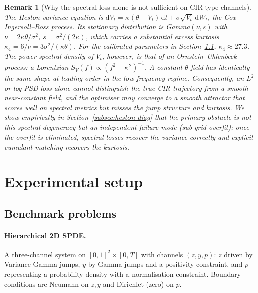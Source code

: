 \documentclass[review,12pt]{elsarticle}
\newtheorem{remark}{Remark}
\begin{document}
\begin{remark}[Why the spectral loss alone is not sufficient on CIR-type channels]
\label{rem:cir}
The Heston variance equation is
\(\mathrm dV_t = \kappa(\theta - V_t)\,\mathrm dt
+ \sigma \sqrt{V_t}\,\mathrm dW_t\), the Cox--Ingersoll--Ross
process. Its stationary distribution is Gamma\((\nu, s)\) with
\(\nu = 2\kappa\theta/\sigma^2\), \(s = \sigma^2/(2\kappa)\),
which carries a substantial excess kurtosis
\(\kappa_4 = 6/\nu = 3\sigma^2/(\kappa\theta)\). For the
calibrated parameters in Section~\ref{subsec:problems},
\(\kappa_4 \approx 27.3\). The power spectral density of
\(V_t\), however, is that of an Ornstein--Uhlenbeck process:
a Lorentzian \(S_V(f) \propto (f^2 + \kappa^2)^{-1}\). A
constant-\(\theta\) field has \emph{identically the same shape}
at leading order in the low-frequency regime. Consequently,
an \(L^2\) or log-PSD loss alone cannot distinguish the true
CIR trajectory from a smooth near-constant field, and the
optimiser may converge to a smooth attractor that scores well
on spectral metrics but misses the jump structure and kurtosis.
We show empirically in Section~\ref{subsec:heston-diag} that
the primary obstacle is not this spectral degeneracy but an
independent failure mode (sub-grid overfit); once the overfit
is eliminated, spectral losses recover the variance correctly
and explicit cumulant matching recovers the kurtosis.
\end{remark}

\section{Experimental setup}
\label{sec:setup}

\subsection{Benchmark problems}
\label{subsec:problems}

\paragraph{Hierarchical 2D SPDE.}
A three-channel system on \([0,1]^2 \times [0, T]\) with channels
\((z, y, p)\): \(z\) driven by Variance-Gamma jumps, \(y\) by
Gamma jumps and a positivity constraint, and \(p\) representing a
probability density with a normalisation constraint. Boundary
conditions are Neumann on \(z, y\) and Dirichlet (zero) on \(p\).
\end{document}
